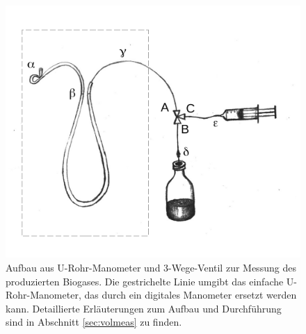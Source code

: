 \documentclass[]{article}
\begin{document}
\begin{figure}
  \includegraphics[]{figs/GD_utube.pdf}
  \caption{Aufbau aus U-Rohr-Manometer und 3-Wege-Ventil zur Messung des produzierten Biogases. Die gestrichelte Linie umgibt das einfache U-Rohr-Manometer, das durch ein digitales Manometer ersetzt werden kann. Detaillierte Erläuterungen zum Aufbau und Durchführung sind in Abschnitt \ref{sec:volmeas} zu finden.} 
  \label{fig:utube}
\end{figure}
\end{document}
